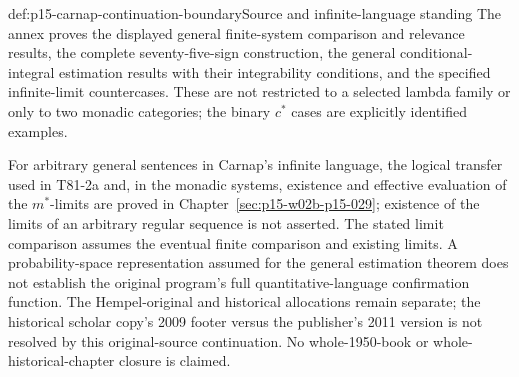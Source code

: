\begin{proofboundary}{def:p15-carnap-continuation-boundary}{Source and infinite-language standing}
The annex proves the displayed general finite-system comparison and
relevance results, the complete seventy-five-sign construction, the
general conditional-integral estimation results with their integrability
conditions, and the specified infinite-limit countercases. These are not
restricted to a selected lambda family or only to two monadic categories;
the binary \(c^*\) cases are explicitly identified examples.

For arbitrary general sentences in Carnap's infinite language, the
logical transfer used in T81-2a and, in the monadic systems, existence
and effective evaluation of the \(m^*\)-limits are proved in
Chapter~\ref{sec:p15-w02b-p15-029}; existence of the limits of an
arbitrary regular sequence is not asserted. The stated limit comparison assumes the eventual
finite comparison and existing limits. A probability-space representation
assumed for the general estimation theorem does not establish the
original program's full quantitative-language confirmation function.
The Hempel-original and historical allocations remain separate; the
historical scholar copy's 2009 footer versus the publisher's 2011
version is not resolved by this original-source continuation. No
whole-1950-book or whole-historical-chapter closure is claimed.
\end{proofboundary}

